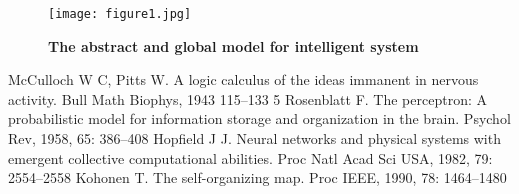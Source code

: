 \documentclass[a4paper,12pt,twocolumn]{article}
\begin{document}
		\begin{figure}[htp]
		\centering
		\texttt{[image: figure1.jpg]}
		\caption{\bfseries{ The abstract and global model for intelligent system}}\label{pic1}
	\end{figure}


	\begin{thebibliography}{99}
	  McCulloch W C, Pitts W. A logic calculus of the ideas immanent in nervous activity. Bull Math Biophys, 1943
	   115–133  5 Rosenblatt F. The perceptron: A probabilistic model for information storage and organization in the brain. Psychol Rev, 1958, 65: 386–408 
	   Hopfield J J. Neural networks and physical systems with emergent collective computational abilities. Proc Natl Acad Sci USA, 1982, 79: 2554–2558
	  Kohonen T. The self-organizing map. Proc IEEE, 1990, 78: 1464–1480 
\end{thebibliography}
\end{document}

